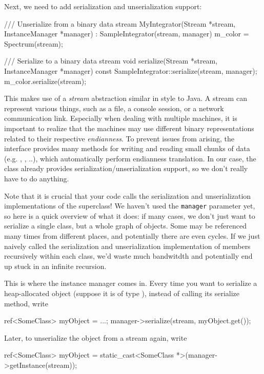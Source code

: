 Next, we need to add serialization and unserialization support:
\begin{cpp}
    /// Unserialize from a binary data stream
    MyIntegrator(Stream *stream, InstanceManager *manager)
     : SampleIntegrator(stream, manager) {
        m_color = Spectrum(stream);
    }

    /// Serialize to a binary data stream
    void serialize(Stream *stream, InstanceManager *manager) const {
        SampleIntegrator::serialize(stream, manager);
        m_color.serialize(stream);
    }
\end{cpp}
This makes use of a \emph{stream} abstraction similar in style to Java. 
A stream can represent various things, such as a file, a console session, or a 
network communication link. Especially when dealing with multiple machines,
it is important to realize that the machines may use different binary representations
related to their respective \emph{endianness}. To prevent issues from arising,
the  interface provides many methods for writing and reading 
small chunks of data (e.g. , , ..),
which automatically perform endianness translation. In our case, the
 class already provides serialization/unserialization support,
so we don't really have to do anything.

Note that it is crucial that your code calls the serialization and unserialization 
implementations of the superclass!
We haven't used the \texttt{manager} parameter yet, so here is a quick overview
of what it does: if many cases, we don't just want to serialize a single class,
but a whole graph of objects. Some may be referenced many
times from different places, and potentially there are even cycles. If we just 
naively called the serialization and unserialization implementation of members 
recursively within each class, we'd waste much bandwitdth and potentially 
end up stuck in an infinite recursion.

This is where the instance manager comes in. Every time you want to serialize
a heap-allocated object (suppose it is of type ), 
instead of calling its serialize method, write

\begin{cpp}
ref<SomeClass> myObject = ...;
manager->serialize(stream, myObject.get());
\end{cpp}

Later, to unserialize the object from a stream again, write
\begin{cpp}
ref<SomeClass> myObject = static_cast<SomeClass *>(manager->getInstance(stream));
\end{cpp}

